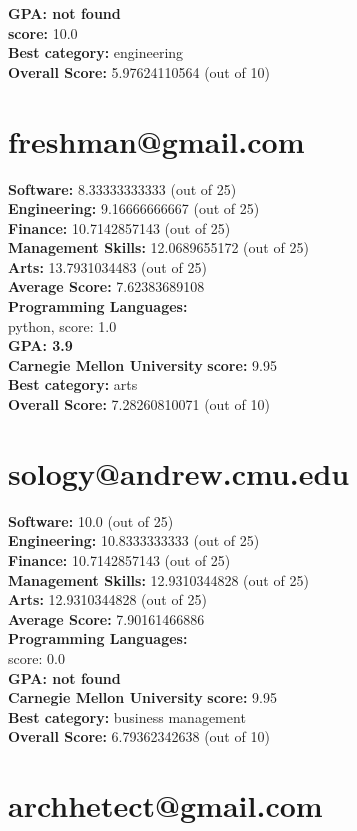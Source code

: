 \documentclass{article}
\begin{document}
\textbf{GPA: not found}\\
 \textbf{score:} 10.0\\
\textbf{Best category: } engineering\\
\textbf{Overall Score: }5.97624110564 (out of 10)\section{freshman@gmail.com}
\textbf{Software:} 8.33333333333 (out of 25)\\
\textbf{Engineering: } 9.16666666667 (out of 25)\\
\textbf{Finance:} 10.7142857143 (out of 25)\\
\textbf{Management Skills:} 12.0689655172 (out of 25)\\
\textbf{Arts:} 13.7931034483 (out of 25)\\
\textbf{Average Score: } 7.62383689108\\
\textbf{Programming Languages:} \\
python, score: 1.0\\
\textbf{GPA: 3.9}\\
\textbf{Carnegie Mellon University} \textbf{score:} 9.95\\
\textbf{Best category: } arts\\
\textbf{Overall Score: }7.28260810071 (out of 10)\section{sology@andrew.cmu.edu}
\textbf{Software:} 10.0 (out of 25)\\
\textbf{Engineering: } 10.8333333333 (out of 25)\\
\textbf{Finance:} 10.7142857143 (out of 25)\\
\textbf{Management Skills:} 12.9310344828 (out of 25)\\
\textbf{Arts:} 12.9310344828 (out of 25)\\
\textbf{Average Score: } 7.90161466886\\
\textbf{Programming Languages:} \\
score: 0.0\\
\textbf{GPA: not found}\\
\textbf{Carnegie Mellon University} \textbf{score:} 9.95\\
\textbf{Best category: } business management\\
\textbf{Overall Score: }6.79362342638 (out of 10)\section{archhetect@gmail.com}
\end{document}
